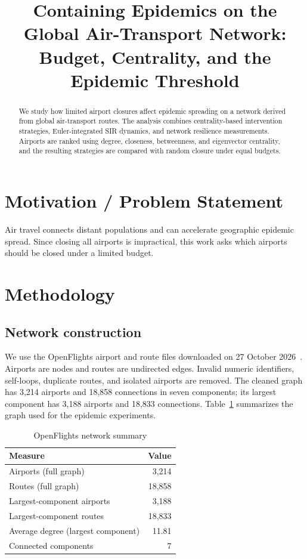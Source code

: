 \documentclass[conference]{IEEEtran}
\title{Containing Epidemics on the Global Air-Transport Network:\\Budget, Centrality, and the Epidemic Threshold}
\author{\IEEEauthorblockN{Krish Dhola (202301189), Prince Sojitra (202301126), Jenish Vasani (202301057)}\IEEEauthorblockA{Group 22}}
\begin{document}
\maketitle
\begin{abstract}
We study how limited airport closures affect epidemic spreading on a network derived from global air-transport routes. The analysis combines centrality-based intervention strategies, Euler-integrated SIR dynamics, and network resilience measurements. Airports are ranked using degree, closeness, betweenness, and eigenvector centrality, and the resulting strategies are compared with random closure under equal budgets.
\end{abstract}

\section{Motivation / Problem Statement}
Air travel connects distant populations and can accelerate geographic epidemic spread. Since closing all airports is impractical, this work asks which airports should be closed under a limited budget.~\cite{keeling2005,pastorsatorras2015}

\section{Methodology}
\subsection{Network construction}
We use the OpenFlights airport and route files downloaded on 27 October 2026~\cite{openflights}. Airports are nodes and routes are undirected edges. Invalid numeric identifiers, self-loops, duplicate routes, and isolated airports are removed. The cleaned graph has 3,214 airports and 18,858 connections in seven components; its largest component has 3,188 airports and 18,833 connections. Table~\ref{tab:network} summarizes the graph used for the epidemic experiments.

\begin{table}[t]\caption{OpenFlights network summary}\label{tab:network}\centering
\begin{tabular}{lr}\toprule Measure & Value\\\midrule
Airports (full graph) & 3,214\\ Routes (full graph) & 18,858\\
Largest-component airports & 3,188\\ Largest-component routes & 18,833\\
Average degree (largest component) & 11.81\\ Connected components & 7\\\bottomrule
\end{tabular}\end{table}
\end{document}
